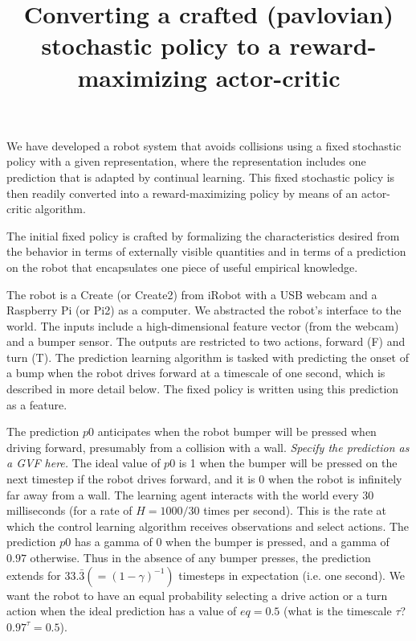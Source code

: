 \documentclass{article}
\begin{document}
\title{Converting a crafted (pavlovian) stochastic policy to a reward-maximizing actor-critic}
\maketitle

\newcommand{\ind}{\mathbb{I}}
\newcommand{\expect}{\mathbb{E}}

We have developed a robot system that avoids collisions using a fixed stochastic policy with a given representation, where the representation includes one prediction that is adapted by continual learning.  This fixed stochastic policy is then readily converted into a reward-maximizing policy by means of an actor-critic algorithm.

The initial fixed policy is crafted by formalizing the characteristics desired from the behavior in terms of externally visible quantities and in terms of a prediction on the robot that encapsulates one piece of useful empirical knowledge. 

The robot is a Create (or Create2) from iRobot with a USB webcam and a Raspberry Pi (or Pi2) as a computer.  We abstracted the robot's interface to the world.  The inputs include a high-dimensional feature vector (from the webcam) and a bumper sensor.  The outputs are restricted to two actions, forward (F) and turn (T).  The prediction learning algorithm is tasked with predicting the onset of a bump when the robot drives forward at a timescale of one second, which is described in more detail below.  The fixed policy is written using this prediction as a feature.

The prediction $p0$ anticipates when the robot bumper will be pressed when driving forward, presumably from a collision with a wall. {\em Specify the prediction as a GVF here.}  The ideal value of $p0$ is 1 when the bumper will be pressed on the next timestep if the robot drives forward, and it is 0 when the robot is infinitely far away from a wall.  The learning agent interacts with the world every 30 milliseconds (for a rate of $H=1000/30$ times per second).  This is the rate at which the control learning algorithm receives observations and select actions.  The prediction $p0$ has a gamma of 0 when the bumper is pressed, and a gamma of $0.97$ otherwise.  Thus in the absence of any bumper presses, the prediction extends for $33.\bar{3} (= (1-\gamma)^{-1})$ timesteps in expectation (i.e. one second).  We want the robot to have an equal probability selecting a drive action or a turn action when the ideal prediction has a value of $eq=0.5$ (what is the timescale $\tau$?  $0.97^{\tau} = 0.5$).
\end{document}
